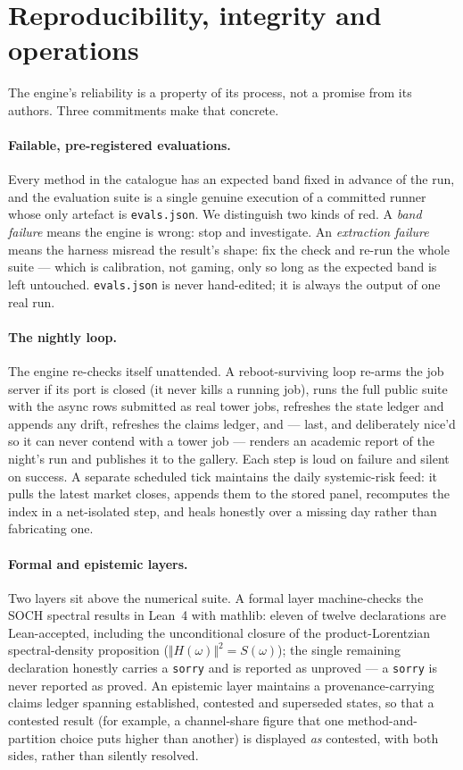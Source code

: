 \documentclass[11pt]{article}
\newcommand{\code}[1]{\texttt{\small #1}}
\begin{document}
\section{Reproducibility, integrity and operations}
\label{sec:integrity}
The engine's reliability is a property of its process, not a promise from its
authors. Three commitments make that concrete.

\paragraph{Failable, pre-registered evaluations.} Every method in the catalogue
has an expected band fixed in advance of the run, and the evaluation suite is a
single genuine execution of a committed runner whose only artefact is
\code{evals.json}. We distinguish two kinds of red. A \emph{band failure} means
the engine is wrong: stop and investigate. An \emph{extraction failure} means
the harness misread the result's shape: fix the check and re-run the whole
suite --- which is calibration, not gaming, only so long as the expected band is
left untouched. \code{evals.json} is never hand-edited; it is always the output
of one real run.

\paragraph{The nightly loop.} The engine re-checks itself unattended. A
reboot-surviving loop re-arms the job server if its port is closed (it never
kills a running job), runs the full public suite with the async rows submitted
as real tower jobs, refreshes the state ledger and appends any drift, refreshes
the claims ledger, and --- last, and deliberately nice'd so it can never contend
with a tower job --- renders an academic report of the night's run and publishes
it to the gallery. Each step is loud on failure and silent on success. A
separate scheduled tick maintains the daily systemic-risk feed: it pulls the
latest market closes, appends them to the stored panel, recomputes the index in
a net-isolated step, and heals honestly over a missing day rather than
fabricating one.

\paragraph{Formal and epistemic layers.} Two layers sit above the numerical
suite. A formal layer machine-checks the SOCH spectral results in Lean~4 with
mathlib: eleven of twelve declarations are Lean-accepted, including the
unconditional closure of the product-Lorentzian spectral-density proposition
($\Vert H(\omega)\Vert^2 = S(\omega)$); the single remaining declaration honestly
carries a \code{sorry} and is reported as unproved --- a \code{sorry} is never
reported as proved. An epistemic layer maintains a provenance-carrying claims
ledger spanning established, contested and superseded states, so that a
contested result (for example, a channel-share figure that one method-and-partition
choice puts higher than another) is displayed \emph{as} contested, with both
sides, rather than silently resolved.
\end{document}
